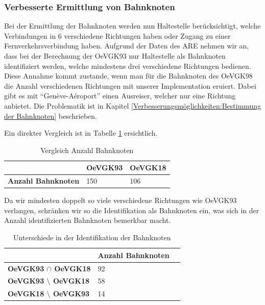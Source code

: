 \subsubsection{Verbesserte Ermittlung von Bahnknoten}
Bei der Ermittlung der Bahnknoten werden nun Haltestelle berücksichtigt, welche Verbindungen in 6 verschiedene Richtungen haben oder Zugang zu einer Fernverkehrsverbindung haben.
Aufgrund der Daten des \acl{ARE} nehmen wir an, dass bei der Berechnung der OeVGK93 nur Haltestelle als Bahnknoten identifiziert werden, welche mindestens drei verschiedene Richtungen bedienen.
Diese Annahme kommt zustande, wenn man für die Bahnknoten des OeVGK98 die Anzahl verschiedenen Richtungen mit unserer Implementation eruiert.
Dabei gibt es mit "`Genève-Aéroport"' einen Ausreiser, welcher nur eine Richtung anbietet.
Die Problematik ist in Kapitel \ref{Verbesserungsmöglichkeiten:Bestimmung der Bahnknoten} beschrieben.

Ein direkter Vergleich ist in Tabelle \ref{table:Vergleich Anzahl Bahnknoten} ersichtlich.

\begin{table}[H]
    \centering
    \begin{tabular}[c]{l l l}
        \toprule
        \textbf{}
                                & \textbf{OeVGK93}
                                & \textbf{OeVGK18}\\
        \midrule
        \textbf{Anzahl Bahnknoten}
                                & 150
                                & 106\\
        \bottomrule
    \end{tabular}
    \caption{Vergleich Anzahl Bahnknoten}
    \label{table:Vergleich Anzahl Bahnknoten}
\end{table}

Da wir mindesten doppelt so viele verschiedene Richtungen wie OeVGK93 verlangen, schränken wir so die Identifikation als Bahnknoten ein, was sich in der Anzahl identifizierten Bahnknoten bemerkbar macht.

\begin{table}[H]
    \centering
    \begin{tabular}[c]{l l l}
        \toprule
        \textbf{}
                                            & \textbf{Anzahl Bahnknoten}\\
        \midrule
        \textbf{OeVGK93 $\cap$ OeVGK18}       & 92\\
        \textbf{OeVGK93 $\setminus$ OeVGK18}  & 58\\
        \textbf{OeVGK18 $\setminus$ OeVGK93}  & 14\\
        \bottomrule
    \end{tabular}
    \caption{Unterschiede in der Identifikation der Bahnknoten}
    \label{table:Unterschiede in der Identifikation der Bahnknoten}
\end{table}

